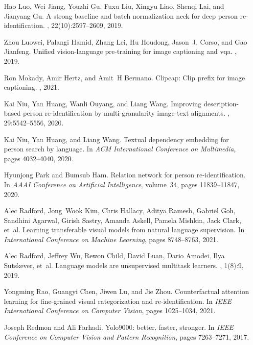\documentclass[10pt,twocolumn,letterpaper]{article}
\begin{document}
\begin{thebibliography}{10}
Hao Luo, Wei Jiang, Youzhi Gu, Fuxu Liu, Xingyu Liao, Shenqi Lai, and Jianyang
  Gu.
\newblock A strong baseline and batch normalization neck for deep person
  re-identification.
, 22(10):2597--2609, 2019.

Zhou Luowei, Palangi Hamid, Zhang Lei, Hu Houdong, Jason~J. Corso, and Gao
  Jianfeng.
\newblock Unified vision-language pre-training for image captioning and vqa.
, 2019.

Ron Mokady, Amir Hertz, and Amit~H Bermano.
\newblock Clipcap: Clip prefix for image captioning.
, 2021.

Kai Niu, Yan Huang, Wanli Ouyang, and Liang Wang.
\newblock Improving description-based person re-identification by
  multi-granularity image-text alignments.
, 29:5542--5556, 2020.

Kai Niu, Yan Huang, and Liang Wang.
\newblock Textual dependency embedding for person search by language.
\newblock In {\em ACM International Conference on Multimedia}, pages
  4032--4040, 2020.

Hyunjong Park and Bumsub Ham.
\newblock Relation network for person re-identification.
\newblock In {\em AAAI Conference on Artificial Intelligence}, volume~34, pages
  11839--11847, 2020.

Alec Radford, Jong~Wook Kim, Chris Hallacy, Aditya Ramesh, Gabriel Goh,
  Sandhini Agarwal, Girish Sastry, Amanda Askell, Pamela Mishkin, Jack Clark,
  et~al.
\newblock Learning transferable visual models from natural language
  supervision.
\newblock In {\em International Conference on Machine Learning}, pages
  8748--8763, 2021.

Alec Radford, Jeffrey Wu, Rewon Child, David Luan, Dario Amodei, Ilya
  Sutskever, et~al.
\newblock Language models are unsupervised multitask learners.
, 1(8):9, 2019.

Yongming Rao, Guangyi Chen, Jiwen Lu, and Jie Zhou.
\newblock Counterfactual attention learning for fine-grained visual
  categorization and re-identification.
\newblock In {\em IEEE International Conference on Computer Vision}, pages
  1025--1034, 2021.

Joseph Redmon and Ali Farhadi.
\newblock Yolo9000: better, faster, stronger.
\newblock In {\em IEEE Conference on Computer Vision and Pattern Recognition},
  pages 7263--7271, 2017.


\end{thebibliography}
\end{document}
